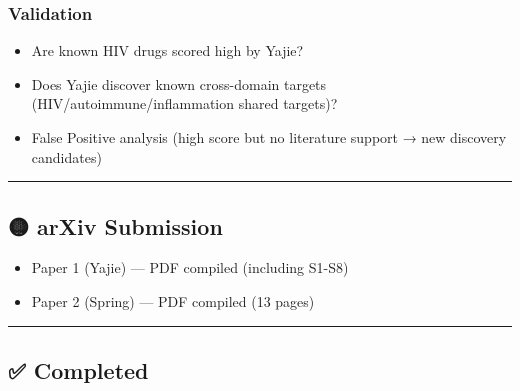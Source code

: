 \documentclass[
  12pt,
]{article}
\providecommand{\tightlist}{%
  \setlength{\itemsep}{0pt}\setlength{\parskip}{0pt}}
\begin{document}
\subsubsection{Validation}\label{validation}

\begin{itemize}
\tightlist
\item[$\square$]
  Are known HIV drugs scored high by Yajie?
\item[$\square$]
  Does Yajie discover known cross-domain targets (HIV/autoimmune/inflammation shared targets)?
\item[$\square$]
  False Positive analysis (high score but no literature support → new discovery candidates)
\end{itemize}

\begin{center}\rule{0.5\linewidth}{0.5pt}\end{center}

\subsection{🟡 arXiv Submission}\label{arxiv-submission}

\begin{itemize}
\tightlist
\item[$\square$]
  Paper 1 (Yajie) --- PDF compiled (including S1-S8)
\item[$\square$]
  Paper 2 (Spring) --- PDF compiled (13 pages)
\end{itemize}

\begin{center}\rule{0.5\linewidth}{0.5pt}\end{center}

\subsection{✅ Completed}\label{completed}
\end{document}
